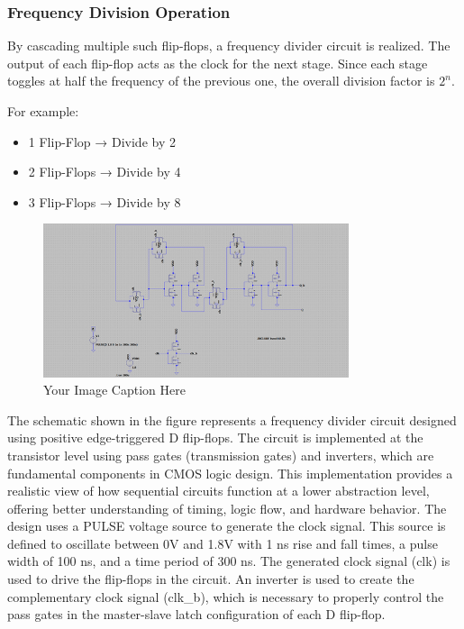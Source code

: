 \subsubsection*{Frequency Division Operation}
By cascading multiple such flip-flops, a frequency divider circuit is realized. The output of each flip-flop acts as the clock for the next stage. Since each stage toggles at half the frequency of the previous one, the overall division factor is \(2^n\).

For example:
\begin{itemize}
    \item 1 Flip-Flop → Divide by 2
    \item 2 Flip-Flops → Divide by 4
    \item 3 Flip-Flops → Divide by 8
\end{itemize}
\begin{figure}[H] %
    \centering
    \includegraphics[width=0.8\textwidth]{figs/circuit.png}
    \caption{Your Image Caption Here}
    \label{fig:LT Spice Circuit}
\end{figure}
The schematic shown in the figure represents a frequency divider circuit designed using positive edge-triggered D flip-flops. The circuit is implemented at the transistor level using pass gates (transmission gates) and inverters, which are fundamental components in CMOS logic design. This implementation provides a realistic view of how sequential circuits function at a lower abstraction level, offering better understanding of timing, logic flow, and hardware behavior.
The design uses a PULSE voltage source to generate the clock signal. This source is defined to oscillate between 0V and 1.8V with 1 ns rise and fall times, a pulse width of 100 ns, and a time period of 300 ns. The generated clock signal (clk) is used to drive the flip-flops in the circuit. An inverter is used to create the complementary clock signal (clk\_b), which is necessary to properly control the pass gates in the master-slave latch configuration of each D flip-flop.


